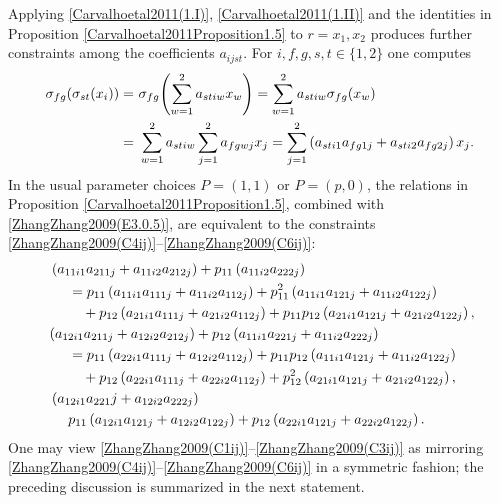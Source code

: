 \documentclass{amsart}
\theoremstyle{definition}
\theoremstyle{remark}
\numberwithin{equation}{section}
\begin{document}
Applying \eqref{Carvalhoetal2011(1.I)}, \eqref{Carvalhoetal2011(1.II)} and the identities in Proposition \ref{Carvalhoetal2011Proposition1.5} to $r=x_1,x_2$ produces further constraints among the coefficients $a_{ijst}$. For $i,f,g,s,t\in\{1,2\}$ one computes
\begin{align}
\sigma_{fg}(\sigma_{st}(x_i))
=&\ \sigma_{fg}\!\left(\sum_{w=1}^2 a_{stiw}x_w\right)
=\sum_{w=1}^2 a_{stiw}\sigma_{fg}(x_w)\notag\\
=&\ \sum_{w=1}^2 a_{stiw}\sum_{j=1}^2 a_{fgwj}x_j
=\sum_{j=1}^2\left(a_{sti1}a_{fg1j}+a_{sti2}a_{fg2j}\right)x_j. \label{ZhangZhang2009(E3.0.5)}
\end{align}
In the usual parameter choices $P=(1,1)$ or $P=(p,0)$, the relations in Proposition \ref{Carvalhoetal2011Proposition1.5}, combined with \eqref{ZhangZhang2009(E3.0.5)}, are equivalent to the constraints \eqref{ZhangZhang2009(C4ij)}--\eqref{ZhangZhang2009(C6ij)}:
\begin{align}
  &\  \left( a_{11i1} a_{211j} + a_{11i2} a_{212j}\right) + p_{11}\left(a_{11i2} a_{222j} \right) \notag \\
  &\ \quad \ = p_{11} \left( a_{11i1} a_{111j} + a_{11i2} a_{112j}\right) + p_{11}^2\left( a_{11i1} a_{121j} + a_{11i2} a_{122j} \right) \notag \\
   &\ \quad \quad \ + p_{12} \left(a_{21i1} a_{111j} + a_{21i2} a_{112j} \right) + p_{11} p_{12} \left( a_{21i1} a_{121j} + a_{21i2} a_{122j} \right), \label{ZhangZhang2009(C4ij)} \\
   &\ (a_{12i1} a_{211j} + a_{12i2} a_{212j}) + p_{12} \left( a_{11i1} a_{221j} + a_{11i2} a_{222j} \right) \notag \\
     &\ \quad \ = p_{11} \left( a_{22i1} a_{111j} + a_{12i2} a_{112j}\right) + p_{11}p_{12} \left( a_{11i1} a_{121j} + a_{11i2} a_{122j} \right) \notag \\
      &\ \quad \quad \ + p_{12} \left( a_{22i1} a_{111j} + a_{22i2} a_{112j} \right) + p_{12}^2 \left( a_{21i1} a_{121j} + a_{21i2} a_{122j} \right),  \label{ZhangZhang2009(C5ij)} \\
   &\  \left( a_{12i1} a_{221}j + a_{12i2} a_{222j} \right) \notag \\
       &\ \quad \ p_{11}\left( a_{12i1} a_{121j} + a_{12i2} a_{122j} \right) + p_{12}\left( a_{22i1} a_{121j} + a_{22i2} a_{122j} \right). \label{ZhangZhang2009(C6ij)}
\end{align}
One may view \eqref{ZhangZhang2009(C1ij)}--\eqref{ZhangZhang2009(C3ij)} as mirroring \eqref{ZhangZhang2009(C4ij)}--\eqref{ZhangZhang2009(C6ij)} in a symmetric fashion; the preceding discussion is summarized in the next statement.
\end{document}
